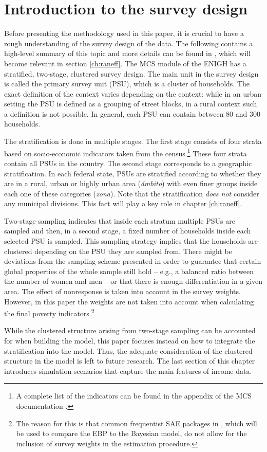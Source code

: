 \section{Introduction to the survey design}
\label{ch:design}

Before presenting the methodology used in this paper, it is crucial to have a rough understanding of the survey design of the data.
The following contains a high-level summary of this topic and more details can be found in \cite{inegi_modulo_2011}, which will become relevant in section \ref{ch:raneff}.
The MCS module of the ENIGH has a stratified, two-stage, clustered survey design.
The main unit in the survey design is called the primary survey unit (PSU), which is a cluster of households.
The exact definition of the context varies depending on the context:
while in an urban setting the PSU is defined as a grouping of street blocks, in a rural context such a definition is not possible.
In general, each PSU can contain between 80 and 300 households.

The stratification is done in multiple stages.
The first stage consists of four strata based on socio-economic indicators taken from the census.\footnote{A complete list of the indicators can be found in the appendix of the MCS documentation \citep{inegi_modulo_2011}.} These four strata contain all PSUs in the country.
The second stage corresponds to a geographic stratification.
In each federal state, PSUs are stratified according to whether they are in a rural, urban or highly urban area (\textit{ámbito}) with even finer groups inside each one of these categories (\textit{zona}).
Note that the stratification \textit{does not} consider any municipal divisions.
This fact will play a key role in chapter \ref{ch:raneff}.

Two-stage sampling indicates that inside each stratum multiple PSUs are sampled and then, in a second stage, a fixed number of households inside each selected PSU is sampled.
This sampling strategy implies that the households are clustered depending on the PSU they are sampled from.
There might be deviations from the sampling scheme presented in order to guarantee that certain global properties of the whole sample still hold – e.g., a balanced ratio between the number of women and men – or that there is enough differentiation in a given area.
The effect of nonresponse is taken into account in the survey weights.
However, in this paper the weights are not taken into account when calculating the final poverty indicators.\footnote{The reason for this is that common frequentist SAE packages in , which will be used to compare the EBP to the Bayesian model, do not allow for the inclusion of survey weights in the estimation procedure.}

While the clustered structure arising from two-stage sampling can be accounted for when building the model, this paper focuses instead on how to integrate the stratification into the model.
Thus, the adequate consideration of the clustered structure in the model is left to future research.
The last section of this chapter introduces simulation scenarios that capture the main features of income data.




